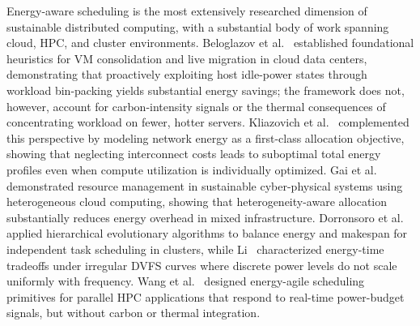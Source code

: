 \documentclass[a4paper,fleqn]{cas-dc}
\begin{document}
Energy-aware scheduling is the most extensively researched dimension of sustainable distributed computing, with a substantial body of work spanning cloud, HPC, and cluster environments. Beloglazov et al.~\cite{ref-beloglazov-fgcs} established foundational heuristics for VM consolidation and live migration in cloud data centers, demonstrating that proactively exploiting host idle-power states through workload bin-packing yields substantial energy savings; the framework does not, however, account for carbon-intensity signals or the thermal consequences of concentrating workload on fewer, hotter servers. Kliazovich et al.~\cite{ref-kliazovich-fgcs} complemented this perspective by modeling network energy as a first-class allocation objective, showing that neglecting interconnect costs leads to suboptimal total energy profiles even when compute utilization is individually optimized. Gai et al.~\cite{ref-gai18} demonstrated resource management in sustainable cyber-physical systems using heterogeneous cloud computing, showing that heterogeneity-aware allocation substantially reduces energy overhead in mixed infrastructure. Dorronsoro et al.~\cite{ref-dorronsoro14} applied hierarchical evolutionary algorithms to balance energy and makespan for independent task scheduling in clusters, while Li~\cite{ref-li18} characterized energy-time tradeoffs under irregular DVFS curves where discrete power levels do not scale uniformly with frequency. Wang et al.~\cite{ref-wang18} designed energy-agile scheduling primitives for parallel HPC applications that respond to real-time power-budget signals, but without carbon or thermal integration.
\end{document}
